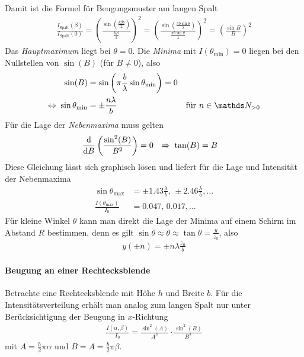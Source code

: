 Damit ist die Formel für Beugungsmuster am langen Spalt
\begin{gather*}
  \frac{I_\text{Spalt}(\beta)}{I_\text{Spalt}(0)}
  = \left(
    \frac{\sin(\frac{k\beta b}{2})}{\frac{k\beta}{2}}
  \right)^2
  = \left(
    \frac{\sin(\frac{\pi b\sin\theta}{\lambda})}
    {\frac{\pi b\sin\theta}{\lambda}}
  \right)^2
  = \left(\frac{\sin B}{B}\right)^2
\end{gather*}
Das \emph{Hauptmaximum} liegt bei $\theta=0$.
Die \emph{Minima} mit $I(\theta_\text{min})=0$ liegen bei den Nullstellen von
$\sin(B)$ (für $B\neq 0$), also 
\begin{align*}
  \sin(B) &= \sin\left(
            \pi\frac{b}{\lambda}\sin\theta_\text{min}
            \right) = 0\\
  \Leftrightarrow\;
  \sin\theta_\text{min} &= \pm\frac{n\lambda}{b}
                        & \text{für } n\in\N_{>0}
\end{align*}
Für die Lage der \emph{Nebenmaxima} muss gelten
\begin{align*}
  \frac{\mathrm{d} }{\mathrm{d} B} \left( \frac{\sin^2(B)}{B^2} \right) &= 0 
  &\Rightarrow\; \tan(B) &= B
\end{align*}
Diese Gleichung lässt sich graphisch lösen und liefert für die Lage
und Intensität der Nebenmaxima
\begin{align*}
  \sin\theta_\text{max}
  &= \pm \num{1,43}\frac{\lambda}{b},\,
    \pm \num{2,46}\frac{\lambda}{b},
    \dotsc\\
  \frac{I(\theta_\text{max})}{I_0} 
  &= \num{0,047} ,\,
    \num{0,017},
    \dotsc
\end{align*}
Für kleine Winkel $\theta$ kann man direkt die Lage der Minima auf
einem Schirm im Abstand $R$ bestimmen, denn es gilt
$\sin\theta\approx\theta\approx\tan\theta=\frac{y}{z_0}$, also
\begin{gather*}
  y(\pm n) = \pm n\lambda\frac{z_0}{b}
\end{gather*}


\paragraph{Beugung an einer Rechtecksblende}%
Betrachte eine Rechtecksblende mit 
Höhe $h$ und
Breite $b$.
Für die Intensitätsverteilung erhält man analog zum langen Spalt nur
unter Berücksichtigung der Beugung in $x$-Richtung
\begin{gather*}
  \frac{I(\alpha,\beta)}{I_0} = \frac{\sin^2(A)}{A^2} \cdot \frac{\sin^2(B)}{B^2}
\end{gather*}
mit $A=\frac{h}{2}\pi\alpha$ und $B=A=\frac{b}{2}\pi\beta$.

